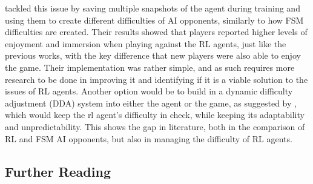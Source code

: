 \documentclass[conference]{IEEEtran}
\begin{document}
\cite{grech_creating_2023} tackled this issue by saving multiple snapshots of the agent during training and using them to create different difficulties of AI opponents, similarly to how FSM difficulties are created.
Their results showed that players reported higher levels of enjoyment and immersion when playing against the RL agents, just like the previous works, with the key difference that new players were also able to enjoy
the game. Their implementation was rather simple, and as such requires more research to be done in improving it and identifying if it is a viable solution to the issues of RL agents. Another option would be
to build in a dynamic difficulty adjustment (DDA) system into either the agent or the game, as suggested by \cite{grech_creating_2023}, which would keep the rl agent's difficulty in check, while keeping its
adaptability and unpredictability. This shows the gap in literature, both in the comparison of RL and FSM AI opponents, but also in managing the difficulty of RL agents.

\subsection{Further Reading}
\end{document}
